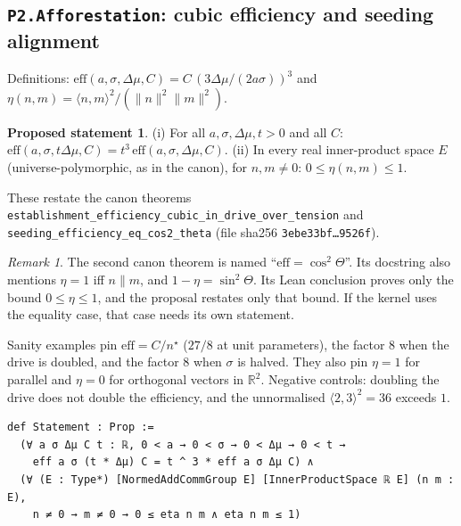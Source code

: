 \documentclass[11pt]{article}
\theoremstyle{definition}
\newtheorem{proposal}[theorem]{Proposed statement}
\theoremstyle{remark}
\newtheorem{remark}[theorem]{Remark}
\begin{document}
\subsection{\texttt{P2.Afforestation}: cubic efficiency and seeding alignment}
Definitions: $\mathrm{eff}(a,\sigma,\Delta\mu,C)=C\,(3\Delta\mu/(2a\sigma))^3$ and $\eta(n,m)=\langle n,m\rangle^2/(\|n\|^2\|m\|^2)$.
\begin{proposal}
(i) For all $a,\sigma,\Delta\mu,t>0$ and all $C$: $\mathrm{eff}(a,\sigma,t\Delta\mu,C)=t^3\,\mathrm{eff}(a,\sigma,\Delta\mu,C)$.
(ii) In every real inner-product space $E$ (universe-polymorphic, as in the canon), for $n,m\ne0$: $0\le\eta(n,m)\le1$.
\end{proposal}
These restate the canon theorems
\texttt{establishment\_efficiency\_cubic\_in\_drive\_over\_tension} and \texttt{seeding\_efficiency\_eq\_cos2\_theta}
 (file sha256 \texttt{3ebe33bf\ldots 9526f}).
\begin{remark}
The second canon theorem is named ``$\mathrm{eff}=\cos^2\Theta$''. Its docstring also mentions $\eta=1$ iff $n\parallel m$, and $1-\eta=\sin^2\Theta$.
Its Lean conclusion proves only the bound $0\le\eta\le1$, and the proposal restates only that bound.
If the kernel uses the equality case, that case needs its own statement.
\end{remark}
Sanity examples pin $\mathrm{eff}=C/n^\star$ ($27/8$ at unit parameters), the factor $8$ when the drive is doubled, and the factor $8$ when $\sigma$ is halved.
They also pin $\eta=1$ for parallel and $\eta=0$ for orthogonal vectors in $\mathbb{R}^2$.
Negative controls: doubling the drive does not double the efficiency, and the unnormalised $\langle2,3\rangle^2=36$ exceeds $1$.
\begin{lstlisting}
def Statement : Prop :=
  (∀ a σ Δμ C t : ℝ, 0 < a → 0 < σ → 0 < Δμ → 0 < t →
    eff a σ (t * Δμ) C = t ^ 3 * eff a σ Δμ C) ∧
  (∀ (E : Type*) [NormedAddCommGroup E] [InnerProductSpace ℝ E] (n m : E),
    n ≠ 0 → m ≠ 0 → 0 ≤ eta n m ∧ eta n m ≤ 1)
\end{lstlisting}
\end{document}

